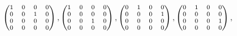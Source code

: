 \documentclass[11pt]{article}
\begin{document}
             \vspace{-2mm}           
$  \hspace{13mm} \scriptsize{        \begin{pmatrix}
                        1&0&0&0\\
                        0&0&1&0\\
                        0&0&0&0\\
                        0&0&0&0\\
                        \end{pmatrix},
                        \begin{pmatrix}
                        1&0&0&0\\
                        0&0&0&0\\
                        0&0&1&0\\
                        0&0&0&0\\
                        \end{pmatrix},
                        \begin{pmatrix}
                        0&1&0&0\\
                        0&0&0&1\\
                        0&0&0&0\\
                        0&0&0&0\\
                        \end{pmatrix},
                        \begin{pmatrix}
                        0&1&0&0\\
                        0&0&0&0\\
                        0&0&0&1\\
                        0&0&0&0\\
                        \end{pmatrix},}$\\[4pt]
                   
\end{document}
